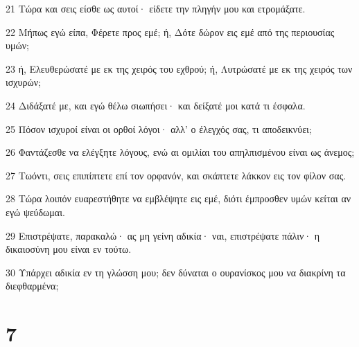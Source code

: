 \par 21 Τώρα και σεις είσθε ως αυτοί· είδετε την πληγήν μου και ετρομάξατε.
\par 22 Μήπως εγώ είπα, Φέρετε προς εμέ; ή, Δότε δώρον εις εμέ από της περιουσίας υμών;
\par 23 ή, Ελευθερώσατέ με εκ της χειρός του εχθρού; ή, Λυτρώσατέ με εκ της χειρός των ισχυρών;
\par 24 Διδάξατέ με, και εγώ θέλω σιωπήσει· και δείξατέ μοι κατά τι έσφαλα.
\par 25 Πόσον ισχυροί είναι οι ορθοί λόγοι· αλλ' ο έλεγχός σας, τι αποδεικνύει;
\par 26 Φαντάζεσθε να ελέγξητε λόγους, ενώ αι ομιλίαι του απηλπισμένου είναι ως άνεμος;
\par 27 Τωόντι, σεις επιπίπτετε επί τον ορφανόν, και σκάπτετε λάκκον εις τον φίλον σας.
\par 28 Τώρα λοιπόν ευαρεστήθητε να εμβλέψητε εις εμέ, διότι έμπροσθεν υμών κείται αν εγώ ψεύδωμαι.
\par 29 Επιστρέψατε, παρακαλώ· ας μη γείνη αδικία· ναι, επιστρέψατε πάλιν· η δικαιοσύνη μου είναι εν τούτω.
\par 30 Υπάρχει αδικία εν τη γλώσση μου; δεν δύναται ο ουρανίσκος μου να διακρίνη τα διεφθαρμένα;

\chapter{7}


